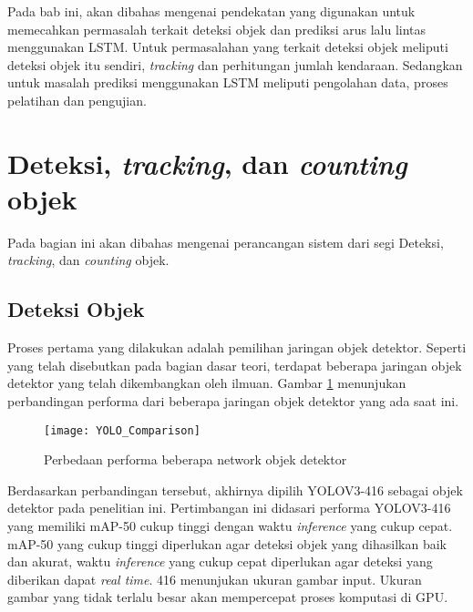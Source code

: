 \documentclass[../thesis.tex]{subfiles}
\begin{document}
Pada bab ini, akan dibahas mengenai pendekatan yang digunakan untuk memecahkan permasalah terkait deteksi objek dan prediksi arus lalu lintas menggunakan LSTM. Untuk permasalahan yang terkait deteksi objek meliputi deteksi objek itu sendiri, \textit{tracking} dan perhitungan jumlah kendaraan. Sedangkan
untuk masalah prediksi menggunakan LSTM meliputi pengolahan data, proses pelatihan dan pengujian.

\section{Deteksi, \textit{tracking}, dan \textit{counting} objek}
Pada bagian ini akan dibahas mengenai perancangan sistem dari segi Deteksi, \textit{tracking}, dan \textit{counting} objek.
\subsection{Deteksi Objek}
Proses pertama yang dilakukan adalah pemilihan jaringan objek detektor. Seperti yang telah disebutkan pada bagian dasar teori, terdapat beberapa jaringan objek detektor yang telah dikembangkan oleh ilmuan. 
Gambar \ref{yolo_comparison} menunjukan perbandingan performa dari beberapa jaringan objek detektor yang ada saat ini.
\begin{figure}
	\centering
	\texttt{[image: YOLO\_Comparison]}
	\caption{Perbedaan performa beberapa network objek detektor}
	\label{yolo_comparison}
\end{figure}

Berdasarkan perbandingan tersebut, akhirnya dipilih YOLOV3-416 sebagai objek detektor pada penelitian ini. Pertimbangan ini didasari performa YOLOV3-416 yang memiliki mAP-50 cukup tinggi dengan waktu \textit{inference} yang cukup cepat. 
mAP-50 yang cukup tinggi diperlukan agar deteksi objek yang dihasilkan baik dan akurat, waktu \textit{inference} yang cukup cepat diperlukan agar deteksi yang diberikan dapat \textit{real time}. 416 menunjukan ukuran gambar input. Ukuran gambar yang tidak terlalu besar akan mempercepat proses komputasi di GPU.
\end{document}
